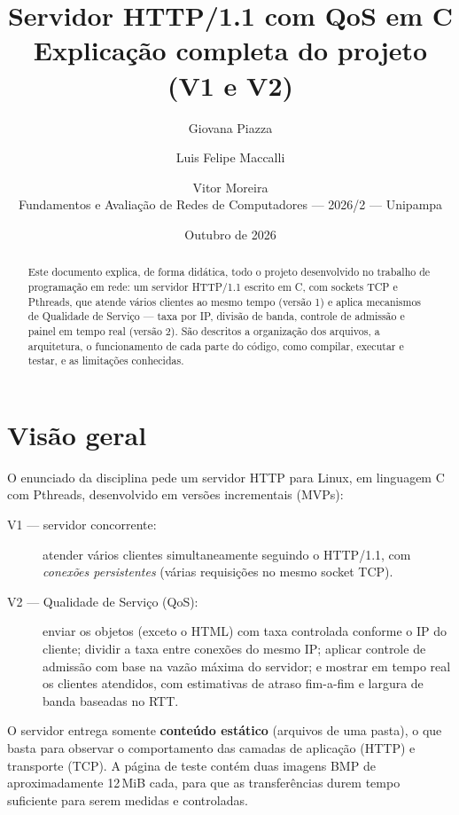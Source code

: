 \documentclass[11pt,a4paper]{article}
\title{\textbf{Servidor HTTP/1.1 com QoS em C}\\[4pt]
\large Explicação completa do projeto (V1 e V2)}
\author{Giovana Piazza \and Luis Felipe Maccalli \and Vitor Moreira\\[4pt]
\small Fundamentos e Avaliação de Redes de Computadores --- 2026/2 --- Unipampa}
\date{Outubro de 2026}
\begin{document}
\maketitle

\begin{abstract}
Este documento explica, de forma didática, todo o projeto desenvolvido no trabalho de
programação em rede: um servidor HTTP/1.1 escrito em C, com sockets TCP e Pthreads, que
atende vários clientes ao mesmo tempo (versão 1) e aplica mecanismos de Qualidade de
Serviço --- taxa por IP, divisão de banda, controle de admissão e painel em tempo real
(versão 2). São descritos a organização dos arquivos, a arquitetura, o funcionamento de
cada parte do código, como compilar, executar e testar, e as limitações conhecidas.
\end{abstract}

\tableofcontents
\newpage

\section{Visão geral}

O enunciado da disciplina pede um servidor HTTP para Linux, em linguagem C com Pthreads,
desenvolvido em versões incrementais (MVPs):

\begin{description}
  \item[V1 --- servidor concorrente:] atender vários clientes simultaneamente seguindo o
  HTTP/1.1, com \emph{conexões persistentes} (várias requisições no mesmo socket TCP).
  \item[V2 --- Qualidade de Serviço (QoS):] enviar os objetos (exceto o HTML) com taxa
  controlada conforme o IP do cliente; dividir a taxa entre conexões do mesmo IP; aplicar
  controle de admissão com base na vazão máxima do servidor; e mostrar em tempo real os
  clientes atendidos, com estimativas de atraso fim-a-fim e largura de banda baseadas no RTT.
\end{description}

O servidor entrega somente \textbf{conteúdo estático} (arquivos de uma pasta), o que basta
para observar o comportamento das camadas de aplicação (HTTP) e transporte (TCP). A página
de teste contém duas imagens BMP de aproximadamente 12\,MiB cada, para que as transferências
durem tempo suficiente para serem medidas e controladas.
\end{document}
